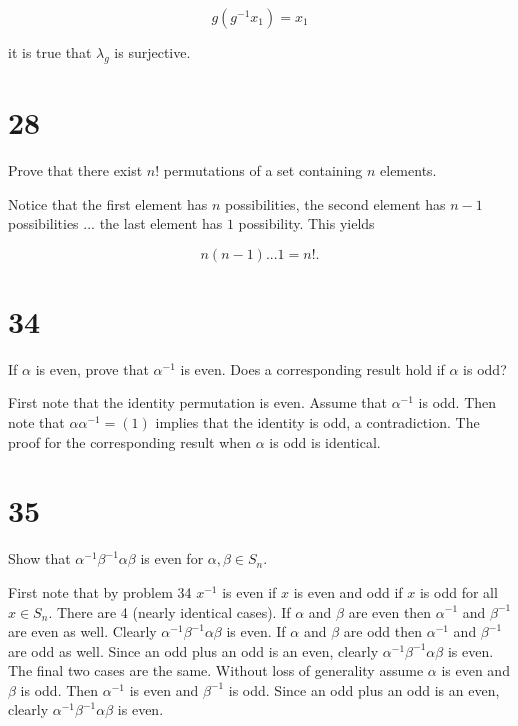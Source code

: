\documentclass[a4paper]{article}
\begin{document}
$$g (g^{-1} x_1) = x_1$$

it is true that $\lambda_g$ is surjective. 


\section*{28}

Prove that there exist $n!$ permutations of a set containing $n$ elements.

\vspace{\baselineskip}

Notice that the first element has $n$ possibilities, the second element  has $n-1$ possibilities ... the last element has $1$ possibility. This yields

$$n(n-1)...1 = n!.$$


\section*{34}

If $\alpha$ is even, prove that $\alpha^{-1}$ is even. Does a corresponding result hold if $\alpha$ is odd?

\vspace{\baselineskip}

First note that the identity permutation is even. Assume that $\alpha^{-1}$ is odd. Then note that $\alpha \alpha^{-1} = (1)$ implies that the identity is odd, a contradiction. The proof for the corresponding result when $\alpha$ is odd is identical.


\section*{35}

Show that $\alpha^{-1} \beta^{-1} \alpha \beta$ is even for $\alpha, \beta \in S_n$.

\vspace{\baselineskip}

First note that by problem 34 $x^{-1}$ is even if $x$ is even and odd if $x$ is odd for all $x \in S_n$. There are 4 (nearly identical cases). If $\alpha$ and $\beta$ are even then $\alpha^{-1}$ and $\beta^{-1}$ are even as well. Clearly $\alpha^{-1} \beta^{-1} \alpha \beta$ is even. If $\alpha$ and $\beta$ are odd then $\alpha^{-1}$ and $\beta^{-1}$ are odd as well. Since an odd plus an odd is an even, clearly $\alpha^{-1} \beta^{-1} \alpha \beta$ is even. The final two cases are the same. Without loss of generality assume $\alpha$ is even and $\beta$ is odd. Then $\alpha^{-1}$ is even and $\beta^{-1}$ is odd. Since an odd plus an odd is an even, clearly $\alpha^{-1} \beta^{-1} \alpha \beta$ is even.
\end{document}
